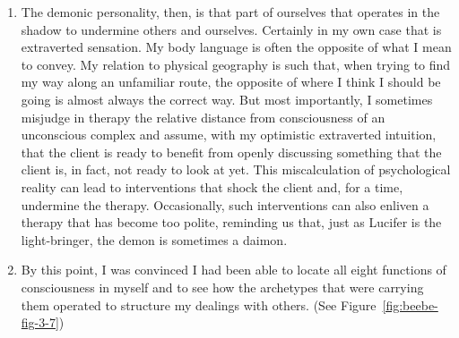\begin{enumerate}
    \item {} The demonic personality, then, is that part of
        ourselves that operates in the shadow to undermine others and
        ourselves. Certainly in my own case that is extraverted sensation. My
        body language is often the opposite of what I mean to convey. My
        relation to physical geography is such that, when trying to find my way
        along an unfamiliar route, the opposite of where I think I should be
        going is almost always the correct way. But most importantly, I
        sometimes misjudge in therapy the relative distance from consciousness
        of an unconscious complex and assume, with my optimistic extraverted
        intuition, that the client is ready to benefit from openly discussing
        something that the client is, in fact, not ready to look at yet. This
        miscalculation of psychological reality can lead to interventions that
        shock the client and, for a time, undermine the therapy. Occasionally,
        such interventions can also enliven a therapy that has become too
        polite, reminding us that, just as Lucifer is the light-bringer, the
        demon is sometimes a daimon.

    \item {} By this point, I was convinced I had been able to
        locate all eight functions of consciousness in myself and to see how
        the archetypes that were carrying them operated to structure my
        dealings with others. (See Figure~\ref{fig:beebe-fig-3-7})


\end{enumerate}
